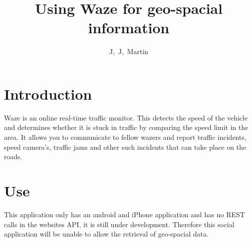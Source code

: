 \documentclass{article}
\title{Using Waze for geo-spacial information}
\author{J,\ J,\ Martin}
\begin{document}
\maketitle
\section{Introduction}
Waze is an online real-time traffic monitor. This detects the speed of the vehicle and determines whether it is stuck in traffic by comparing the speed limit in the area. It allows you to communicate to fellow wazers and report traffic incidents, speed camera's, traffic jams and other such incidents that can take place on the roads.
\section{Use}
This application only has an android and iPhone application and has no REST calls in the websites API, it is still under development. Therefore this social application will be unable to allow the retrieval of geo-spacial data.
\end{document}
